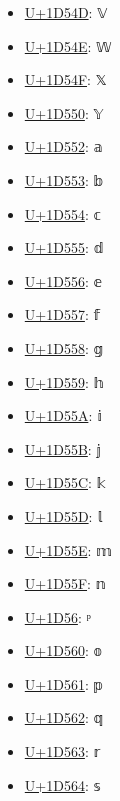 \begin{itemize}
	\item \href{https://www.compart.com/en/unicode/U+1D54D}{U+1D54D}: 𝕍
	\item \href{https://www.compart.com/en/unicode/U+1D54E}{U+1D54E}: 𝕎
	\item \href{https://www.compart.com/en/unicode/U+1D54F}{U+1D54F}: 𝕏
	\item \href{https://www.compart.com/en/unicode/U+1D550}{U+1D550}: 𝕐
	\item \href{https://www.compart.com/en/unicode/U+1D552}{U+1D552}: 𝕒
	\item \href{https://www.compart.com/en/unicode/U+1D553}{U+1D553}: 𝕓
	\item \href{https://www.compart.com/en/unicode/U+1D554}{U+1D554}: 𝕔
	\item \href{https://www.compart.com/en/unicode/U+1D555}{U+1D555}: 𝕕
	\item \href{https://www.compart.com/en/unicode/U+1D556}{U+1D556}: 𝕖
	\item \href{https://www.compart.com/en/unicode/U+1D557}{U+1D557}: 𝕗
	\item \href{https://www.compart.com/en/unicode/U+1D558}{U+1D558}: 𝕘
	\item \href{https://www.compart.com/en/unicode/U+1D559}{U+1D559}: 𝕙
	\item \href{https://www.compart.com/en/unicode/U+1D55A}{U+1D55A}: 𝕚
	\item \href{https://www.compart.com/en/unicode/U+1D55B}{U+1D55B}: 𝕛
	\item \href{https://www.compart.com/en/unicode/U+1D55C}{U+1D55C}: 𝕜
	\item \href{https://www.compart.com/en/unicode/U+1D55D}{U+1D55D}: 𝕝
	\item \href{https://www.compart.com/en/unicode/U+1D55E}{U+1D55E}: 𝕞
	\item \href{https://www.compart.com/en/unicode/U+1D55F}{U+1D55F}: 𝕟
	\item \href{https://www.compart.com/en/unicode/U+1D56}{U+1D56}: ᵖ
	\item \href{https://www.compart.com/en/unicode/U+1D560}{U+1D560}: 𝕠
	\item \href{https://www.compart.com/en/unicode/U+1D561}{U+1D561}: 𝕡
	\item \href{https://www.compart.com/en/unicode/U+1D562}{U+1D562}: 𝕢
	\item \href{https://www.compart.com/en/unicode/U+1D563}{U+1D563}: 𝕣
	\item \href{https://www.compart.com/en/unicode/U+1D564}{U+1D564}: 𝕤

\end{itemize}
